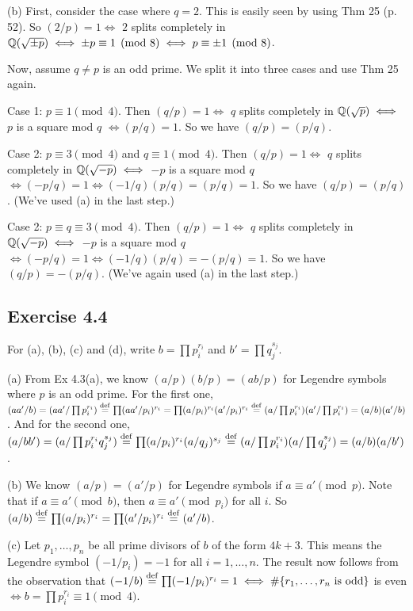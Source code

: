 \documentclass[../Marcus.tex]{subfiles}
\begin{document}
(b) First, consider the case where $q=2$. This is easily seen by using Thm 25 (p. 52). So $(2/p)=1 \iff$ $2$ splits completely in $\mathbb{Q}(\sqrt{\pm p}) \iff \pm p\equiv 1 \pmod{8} \iff p\equiv \pm1 \pmod{8}$.

Now, assume $q\neq p$ is an odd prime. We split it into three cases and use Thm 25 again.

Case 1: $p\equiv 1\pmod{4}$. Then $(q/p)=1 \iff$ $q$ splits completely in $\mathbb{Q}(\sqrt{p}) \iff$ $p$ is a square mod $q$ $\iff (p/q)=1$. So we have $(q/p)=(p/q)$.

Case 2: $p\equiv 3\pmod{4}$ and $q\equiv 1\pmod{4}$. Then $(q/p)=1 \iff$ $q$ splits completely in $\mathbb{Q}(\sqrt{-p}) \iff$ $-p$ is a square mod $q$ $\iff (-p/q)=1 \iff (-1/q)(p/q)=(p/q)=1$. So we have $(q/p)=(p/q)$. (We've used (a) in the last step.)

Case 2: $p\equiv q \equiv3\pmod{4}$. Then $(q/p)=1 \iff$ $q$ splits completely in $\mathbb{Q}(\sqrt{-p}) \iff$ $-p$ is a square mod $q$ $\iff (-p/q)=1 \iff (-1/q)(p/q)=-(p/q)=1$. So we have $(q/p)=-(p/q)$. (We've again used (a) in the last step.)

\subsection*{Exercise 4.4}

For (a), (b), (c) and (d), write $b=\prod p_i^{r_i}$ and $b'=\prod q_j^{s_j}$.

(a) From Ex 4.3(a), we know $(a/p)(b/p)=(ab/p)$ for Legendre symbols where $p$ is an odd prime. For the first one, $(aa'/b)=(aa'/\prod p_i^{r_i})\overset{\operatorname{def}}{=}\prod (aa'/p_i)^{r_i}=\prod (a/p_i)^{r_i}(a'/p_i)^{r_i}\overset{\operatorname{def}}{=}(a/\prod p_i^{r_i})(a'/\prod p_i^{r_i})=(a/b)(a'/b)$. And for the second one, $(a/bb')=(a/\prod p_i^{r_i}q_j^{s_j})\overset{\operatorname{def}}{=}\prod (a/p_i)^{r_i}(a/q_j)^{s_j}\overset{\operatorname{def}}{=}(a/\prod p_i^{r_i})(a/\prod q_j^{s_j})=(a/b)(a/b')$.

(b) We know $(a/p)=(a'/p)$ for Legendre symbols if $a\equiv a'\pmod{p}$. Note that if $a\equiv a'\pmod{b}$, then $a\equiv a'\pmod{p_i}$ for all $i$. So $(a/b)\overset{\operatorname{def}}{=}\prod (a/p_i)^{r_i}=\prod (a'/p_i)^{r_i}\overset{\operatorname{def}}{=}(a'/b)$.

(c) Let $p_1,\ldots,p_n$ be all prime divisors of $b$ of the form $4k+3$. This means the Legendre symbol $(-1/p_i)=-1$ for all $i=1,\ldots,n$. The result now follows from the observation that $(-1/b)\overset{\operatorname{def}}{=}\prod (-1/p_i)^{r_i}=1 \iff \#\{r_1,\ldots,r_n \text{ is odd}\}$ is even $\iff b=\prod p_i^{r_i}\equiv 1\pmod{4}$.
\end{document}
